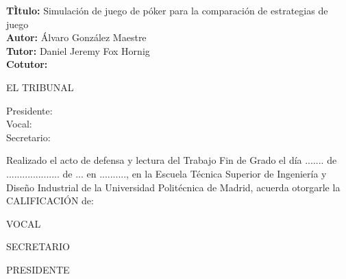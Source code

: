 \cleardoublepage

\begin{flushleft} \large
\textbf{TÌtulo:} Simulación de juego de póker para la comparación de estrategias de juego \\
\textbf{Autor:} Álvaro González Maestre\\
\textbf{Tutor:} Daniel Jeremy Fox Hornig\\ 
\textbf{Cotutor:} \\ [1 cm]

\end{flushleft} 

\begin{center} \LARGE
EL TRIBUNAL \\ [1 cm]
\end{center}

\begin{flushleft} \LARGE
Presidente: \\ [1 cm]
Vocal: \\ [1 cm]
Secretario: \\ [1.5 cm]
\end{flushleft}

\large
Realizado el acto de defensa y lectura del Trabajo Fin de Grado el día ....... de ....................   de ... en .........., en la Escuela Técnica Superior de Ingeniería y Diseño Industrial de la Universidad Politécnica de Madrid, acuerda otorgarle la CALIFICACIÓN de: \\ [2 cm]

\begin{center}
 \large VOCAL \\ [2.2 cm]
\end{center}

\begin{minipage}{0.5\textwidth}
 \begin{flushleft}
 \large SECRETARIO
\end{flushleft}
\end{minipage}
\begin{minipage}{0.5\textwidth}
\begin{flushright}
 \large PRESIDENTE
\end{flushright} 
\end{minipage}